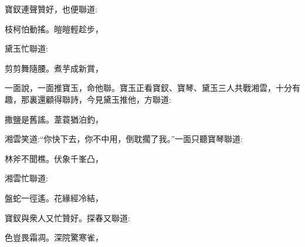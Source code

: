 \begin{parag}
    寶釵連聲贊好，也便聯道:
\end{parag}


\begin{poem}
    \begin{pl} 枝柯怕動搖。皚皚輕趁步，\end{pl}
\end{poem}


\begin{parag}
    黛玉忙聯道:
\end{parag}


\begin{poem}
    \begin{pl} 剪剪舞隨腰。煮芋成新賞，\end{pl}
\end{poem}


\begin{parag}
    一面說，一面推寶玉，命他聯。寶玉正看寶釵、寶琴、黛玉三人共戰湘雲，十分有趣，那裏還顧得聯詩，今見黛玉推他，方聯道:
\end{parag}


\begin{poem}
    \begin{pl} 撒鹽是舊謠。葦蓑猶泊釣，\end{pl}
\end{poem}


\begin{parag}
    湘雲笑道:“你快下去，你不中用，倒耽擱了我。”一面只聽寶琴聯道:
\end{parag}


\begin{poem}
    \begin{pl} 林斧不聞樵。伏象千峯凸，\end{pl}
\end{poem}


\begin{parag}
    湘雲忙聯道:
\end{parag}


\begin{poem}
    \begin{pl} 盤蛇一徑遙。花緣經冷結，\end{pl}
\end{poem}


\begin{parag}
    寶釵與衆人又忙贊好。探春又聯道:
\end{parag}


\begin{poem}
    \begin{pl} 色豈畏霜凋。深院驚寒雀，\end{pl}
\end{poem}


